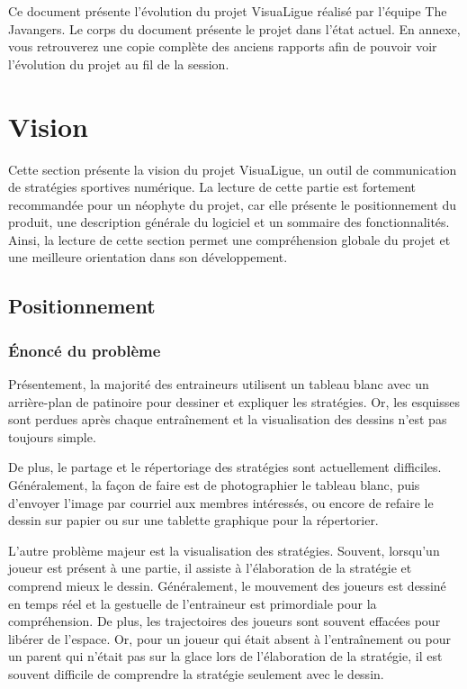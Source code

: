 \documentclass[ULlof]{ULrapport}
\begin{document}
	
Ce document présente l'évolution du projet VisuaLigue réalisé par l'équipe The Javangers. Le corps du document présente le projet dans l'état actuel. En annexe, vous retrouverez une copie complète des anciens rapports afin de pouvoir voir l'évolution du projet au fil de la session.

\chapter{Vision}
Cette section présente la vision du projet VisuaLigue, un outil de communication de stratégies sportives numérique. La lecture de cette partie est fortement recommandée pour un néophyte du projet, car elle présente le positionnement du produit, une description générale du logiciel et un sommaire des fonctionnalités. Ainsi, la lecture de cette section permet une compréhension globale du projet et une meilleure orientation dans son développement.

\section{Positionnement}
\subsection{Énoncé du problème}
Présentement, la majorité des entraineurs utilisent un tableau blanc avec un arrière-plan de patinoire pour dessiner et expliquer les stratégies. Or, les esquisses sont perdues après chaque entraînement et la visualisation des dessins n'est pas toujours simple.

De plus, le partage et le répertoriage des stratégies sont actuellement difficiles. Généralement, la façon de faire est de photographier le tableau blanc, puis d'envoyer l'image par courriel aux membres intéressés, ou encore de refaire le dessin sur papier ou sur une tablette graphique pour la répertorier.

L'autre problème majeur est la visualisation des stratégies. Souvent, lorsqu'un joueur est présent à une partie, il assiste à l'élaboration de la stratégie et comprend mieux le dessin. Généralement, le mouvement des joueurs est dessiné en temps réel et la gestuelle de l'entraineur est primordiale pour la compréhension. De plus, les trajectoires des joueurs sont souvent effacées pour libérer de l'espace. Or, pour un joueur qui était absent à l'entraînement ou pour un parent qui n'était pas sur la glace lors de l'élaboration de la stratégie, il est souvent difficile de comprendre la stratégie seulement avec le dessin.
\end{document}
